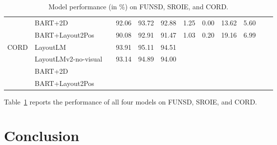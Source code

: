 \begin{table}
\begin{adjustbox}{max width=\textwidth}
\begin{threeparttable}
\begin{tabular}{llcccccccccc}
      & BART+2D &  & 92.06 &	93.72 & 92.88 & 1.25 &0.00 & 13.62 & 5.60 \\
      & BART+Layout2Pos &  & 90.08 &	92.91 &	91.47 & 1.03 & 0.20 &	19.16 &	6.99 \\
      \midrule
      \multirow{4}{*}{CORD} & LayoutLM  \citep{xu2020layoutlm} & & 93.91 & 95.11 & 94.51 & \cellcolor[gray]{0.9} & \cellcolor[gray]{0.9} & \cellcolor[gray]{0.9} & \cellcolor[gray]{0.9}  \\ 
      & LayoutLMv2-no-visual             & & 93.14 &	94.89 &	94.00 & \cellcolor[gray]{0.9} & \cellcolor[gray]{0.9} & \cellcolor[gray]{0.9} &  \cellcolor[gray]{0.9} \\  
      & BART+2D &  \\
      & BART+Layout2Pos &  \\
      \bottomrule
  \end{tabular}
  \end{threeparttable}
  \end{adjustbox}
  \caption{Model performance (in \%) on FUNSD, SROIE, and CORD.}
  \label{table:visual-information-extraction-results}
\end{table}


Table~\ref{table:visual-information-extraction-results} reports the performance of all four models on FUNSD, SROIE, and CORD.


\section{Conclusion}